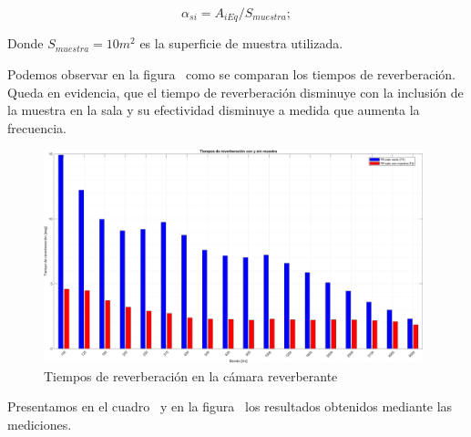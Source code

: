 \begin{equation}
    \alpha_{si} = A_{iEq} / S_{muestra};
\end{equation}

\par Donde $S_{muestra} = 10m^2$ es la superficie de muestra utilizada.\\


\par Podemos observar en la figura~ como se comparan los tiempos de reverberación. Queda en evidencia, que el tiempo de reverberación disminuye con la inclusión de la muestra en la sala y su efectividad disminuye a medida que aumenta la frecuencia.



\begin{figure}[H]
	\centering
	\includegraphics[width=0.98\textwidth]{./img/Tiempos_reverberacion_bars.png}
	\caption{Tiempos de reverberación en la cámara reverberante}
	\label{fig::tiempos_reverberacion}
\end{figure}


\par Presentamos en el cuadro~ y en la figura~ los resultados obtenidos mediante las mediciones.


